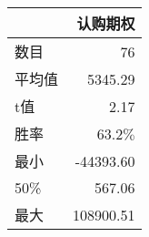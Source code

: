 \begin{tabular}{lr}
\toprule
{} &             认购期权 \\
\midrule
数目 &      76\\
平均值  &    5345.29\\
t值   &   2.17 \\
胜率 & 63.2$\%$\\
最小   &  -44393.60 \\

50\%   &     567.06 \\

最大   &  108900.51 \\
\bottomrule
\end{tabular}
